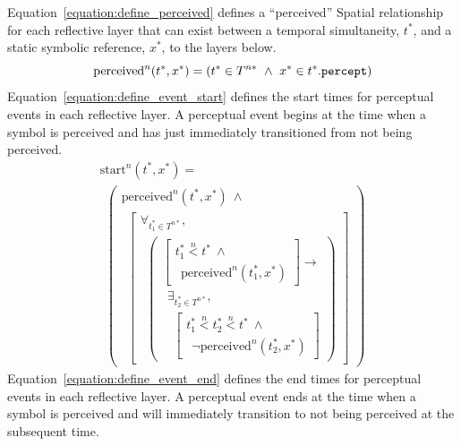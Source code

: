 {\mbox{Equation~\ref{equation:define_perceived}}} defines a
``perceived'' Spatial relationship for each reflective layer that can
exist between a temporal simultaneity, $t^*$, and a static symbolic
reference, $x^*$, to the layers below.
\begin{equation}
\label{equation:define_perceived}
\text{perceived}^n(t^*, x^*) = (t^* \in T^{n*} ~\wedge~ x^* \in t^*.\text{\tt{percept}})
\end{equation}
{\mbox{Equation~\ref{equation:define_event_start}}} defines the start
times for perceptual events in each reflective layer.  A perceptual
event begins at the time when a symbol is perceived and has just
immediately transitioned from not being perceived.
\begin{equation}
\label{equation:define_event_start}
\begin{array}{l}
  \text{start}^n(t^*, x^*) = \\
  ~~\left(
  \begin{array}{l}
  \text{perceived}^n(t^*, x^*) ~\wedge~ \\
  ~~\left[
  \begin{array}{l}
  \forall_{t_1^* \in T^{n*}}, \\
  ~~\left(\begin{array}{l}
            \left[\begin{array}{l}
                    t_1^* \stackrel{n}{<} t^* ~\wedge~ \\
                    ~~\text{perceived}^n(t_1^*, x^*)\end{array}\right] \longrightarrow \\
            ~~\exists_{t_2^* \in T^{n*}}, \\
            ~~~~\left[\begin{array}{l}
                        t_1^* \stackrel{n}{<} t_2^* \stackrel{n}{<} t^* ~\wedge~ \\
                        ~~\neg\text{perceived}^n(t_2^*, x^*)\end{array}\right]\end{array}\right)
  \end{array}
  \right]
  \end{array}\right)
\end{array}
\end{equation}
{\mbox{Equation~\ref{equation:define_event_end}}} defines the end
times for perceptual events in each reflective layer.  A perceptual
event ends at the time when a symbol is perceived and will immediately
transition to not being perceived at the subsequent time.

